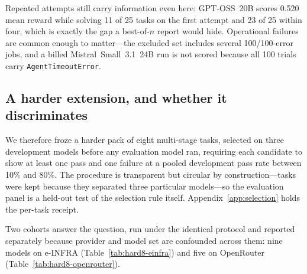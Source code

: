 \documentclass[11pt]{article}
\begin{document}
\begin{table}[t]
\centering
\small
\caption{Included OpenRouter $k=4$ runs on the 25-task core, ordered by mean reward. Pass denominators are explicit scored-task counts.}
\label{tab:headline}

\end{table}

Repeated attempts still carry information even here: GPT-OSS~20B scores 0.520 mean reward while solving 11 of 25 tasks on the first attempt and 23 of 25 within four, which is exactly the gap a best-of-$n$ report would hide.
Operational failures are common enough to matter---the excluded set includes several 100/100-error jobs, and a billed Mistral~Small~3.1~24B run is not scored because all 100 trials carry \texttt{AgentTimeoutError}.

\subsection*{A harder extension, and whether it discriminates}

We therefore froze a harder pack of eight multi-stage tasks, selected on three development models before any evaluation model ran, requiring each candidate to show at least one pass and one failure at a pooled development pass rate between 10\% and 80\%.
The procedure is transparent but circular by construction---tasks were kept because they separated three particular models---so the evaluation panel is a held-out test of the selection rule itself.
Appendix~\ref{app:selection} holds the per-task receipt.

Two cohorts answer the question, run under the identical protocol and reported separately because provider and model set are confounded across them: nine models on e-INFRA (Table~\ref{tab:hard8-einfra}) and five on OpenRouter (Table~\ref{tab:hard8-openrouter}).

\begin{table}[t]
\centering
\small
\caption{Extension, e-INFRA cohort (August 13--14, 2026), all nine models scored. \texttt{kimi-k3} is scored from a re-run after a provider outage invalidated its first attempt; both receipts are retained.}
\label{tab:hard8-einfra}

\end{table}

\begin{table}[t]
\centering
\small
\caption{Extension, OpenRouter cohort. Cost is billed provider cost, reported only because this provider bills per token.}
\label{tab:hard8-openrouter}

\end{table}
\end{document}
